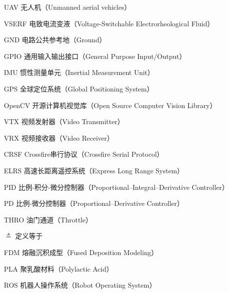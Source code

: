 
\begin{denotation}[3cm]
  \item[UAV] 无人机（Unmanned aerial vehicles）
  \item[VSERF] 电致电流变液（Voltage-Switchable Electrorheological Fluid）
  \item[GND] 电路公共参考地（Ground）
  \item[GPIO] 通用输入输出接口（General Purpose Input/Output）
  \item[IMU] 惯性测量单元（Inertial Measurement Unit）
  \item[GPS] 全球定位系统（Global Positioning System）
  \item[OpenCV] 开源计算机视觉库（Open Source Computer Vision Library）
  \item[VTX] 视频发射器（Video Transmitter）
  \item[VRX] 视频接收器（Video Receiver）
  \item[CRSF] Crossfire串行协议（Crossfire Serial Protocol）
  \item[ELRS] 高速长距离遥控系统（Express Long Range System）
  \item[PID] 比例-积分-微分控制器（Proportional–Integral–Derivative Controller）
  \item[PD] 比例-微分控制器（Proportional–Derivative Controller）
  \item[THRO] 油门通道（Throttle）
  \item[$\triangleq$] 定义等于
  \item[FDM] 熔融沉积成型（Fused Deposition Modeling）
  \item[PLA] 聚乳酸材料（Polylactic Acid）
  \item[ROS] 机器人操作系统（Robot Operating System）
\end{denotation}





